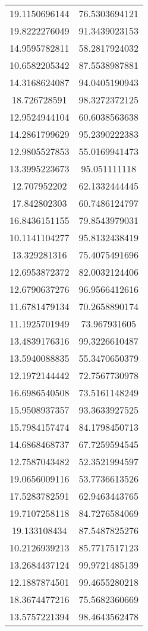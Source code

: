 \begin{table}
\begin{tabular}{cc}
19.1150696144 & 76.5303694121 \\
19.8222276049 & 91.3439023153 \\
14.9595782811 & 58.2817924032 \\
10.6582205342 & 87.5538987881 \\
14.3168624087 & 94.0405190943 \\
18.726728591 & 98.3272372125 \\
12.9524944104 & 60.6038563638 \\
14.2861799629 & 95.2390222383 \\
12.9805527853 & 55.0169941473 \\
13.3995223673 & 95.051111118 \\
12.707952202 & 62.1332444445 \\
17.842802303 & 60.7486124797 \\
16.8436151155 & 79.8543979031 \\
10.1141104277 & 95.8132438419 \\
13.329281316 & 75.4075491696 \\
12.6953872372 & 82.0032124406 \\
12.6790637276 & 96.9566412616 \\
11.6781479134 & 70.2658890174 \\
11.1925701949 & 73.967931605 \\
13.4839176316 & 99.3226610487 \\
13.5940088835 & 55.3470650379 \\
12.1972144442 & 72.7567730978 \\
16.6986540508 & 73.5161148249 \\
15.9508937357 & 93.3633927525 \\
15.7984157474 & 84.1798450713 \\
14.6868468737 & 67.7259594545 \\
12.7587043482 & 52.3521994597 \\
19.0656009116 & 53.7736613526 \\
17.5283782591 & 62.9463443765 \\
19.7107258118 & 84.7276584069 \\
19.133108434 & 87.5487825276 \\
10.2126939213 & 85.7717517123 \\
13.2684437124 & 99.9721485139 \\
12.1887874501 & 99.4655280218 \\
18.3674477216 & 75.5682360669 \\
13.5757221394 & 98.4643562478 \\

\end{tabular}
\end{table}
